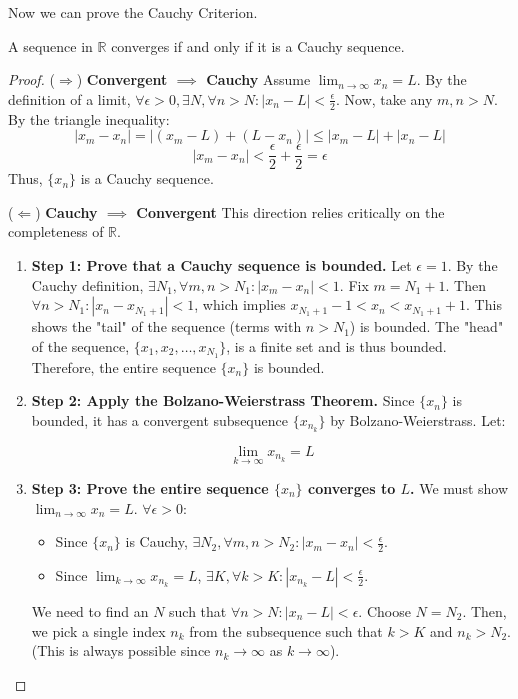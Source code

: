 Now we can prove the Cauchy Criterion.

\begin{theorem}
\label{thm:cauchy_en}
A sequence in $\mathbb{R}$ converges if and only if it is a Cauchy sequence.
\end{theorem}

\begin{proof}
($\Rightarrow$) \textbf{Convergent $\implies$ Cauchy}
Assume $\lim_{n \to \infty} x_n = L$.
By the definition of a limit, $\forall \epsilon > 0, \exists N, \forall n > N: |x_n - L| < \frac{\epsilon}{2}$.
Now, take any $m, n > N$. By the triangle inequality:
\[
|x_m - x_n| = |(x_m - L) + (L - x_n)| \leq |x_m - L| + |x_n - L|
\]
\[
|x_m - x_n| < \frac{\epsilon}{2} + \frac{\epsilon}{2} = \epsilon
\]
Thus, $\{x_n\}$ is a Cauchy sequence.

($\Leftarrow$) \textbf{Cauchy $\implies$ Convergent}
This direction relies critically on the completeness of $\mathbb{R}$.
\begin{enumerate}
    \item \textbf{Step 1: Prove that a Cauchy sequence is bounded.}
    Let $\epsilon = 1$. By the Cauchy definition, $\exists N_1, \forall m, n > N_1: |x_m - x_n| < 1$.
    Fix $m = N_1 + 1$. Then $\forall n > N_1: |x_n - x_{N_1+1}| < 1$, which implies $x_{N_1+1} - 1 < x_n < x_{N_1+1} + 1$.
    This shows the "tail" of the sequence (terms with $n > N_1$) is bounded.
    The "head" of the sequence, $\{x_1, x_2, \dots, x_{N_1}\}$, is a finite set and is thus bounded.
    Therefore, the entire sequence $\{x_n\}$ is bounded.
    
    \item \textbf{Step 2: Apply the Bolzano-Weierstrass Theorem.}
    Since $\{x_n\}$ is bounded, it has a convergent subsequence $\{x_{n_k}\}$ by Bolzano-Weierstrass.
    Let:
    
    $$\lim_{k \to \infty} x_{n_k} = L$$
    
    \item \textbf{Step 3: Prove the entire sequence $\{x_n\}$ converges to $L$.}
    We must show $\lim_{n \to \infty} x_n = L$.
    $\forall \epsilon > 0$:
    \begin{itemize}
        \item Since $\{x_n\}$ is Cauchy, $\exists N_2, \forall m, n > N_2: |x_m - x_n| < \frac{\epsilon}{2}$.
        \item Since $\lim_{k \to \infty} x_{n_k} = L$, $\exists K, \forall k > K: |x_{n_k} - L| < \frac{\epsilon}{2}$.
    \end{itemize}
    We need to find an $N$ such that $\forall n > N: |x_n - L| < \epsilon$.
    Choose $N = N_2$. Then, we pick a single index $n_k$ from the subsequence such that $k > K$ and $n_k > N_2$. (This is always possible since $n_k \to \infty$ as $k \to \infty$).
    

\end{enumerate}
\end{proof}
